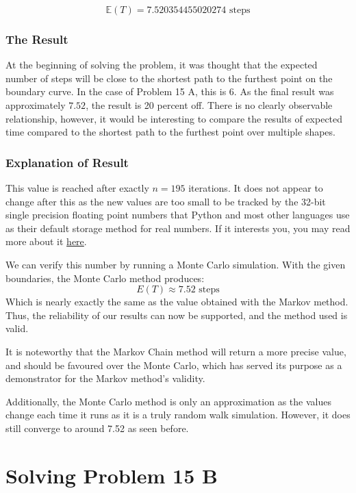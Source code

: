 \documentclass[12pt,a4paper]{article}
\begin{document}
\begin{equation*}
    \mathbb{E}(T) = 7.520354455020274 \text{ steps}
\end{equation*}

\subsubsection{The Result}
At the beginning of solving the problem, it was thought that the expected number of steps will be close to the shortest path to the furthest point on the boundary curve. In the case of Problem 15 A, this is $6$. As the final result was approximately $7.52$, the result is 20 percent off. There is no clearly observable relationship, however, it would be interesting to compare the results of expected time compared to the shortest path to the furthest point over multiple shapes.

\subsubsection{Explanation of Result}
This value is reached after exactly $n = 195$ iterations. It does not appear to change after this as the new values are too small to be tracked by the 32-bit single precision floating point numbers that Python and most other languages use as their default storage method for real numbers. If it interests you, you may read more about it \href{https://en.wikipedia.org/wiki/Single-precision_floating-point_format}{here}.

We can verify this number by running a Monte Carlo simulation. With the given boundaries, the Monte Carlo method produces:
\begin{equation*}
    E(T) \approx 7.52 \text{ steps}
\end{equation*}
Which is nearly exactly the same as the value obtained with the Markov method. Thus, the reliability of our results can now be supported, and the method used is valid.

It is noteworthy that the Markov Chain method will return a more precise value, and should be favoured over the Monte Carlo, which has served its purpose as a demonstrator for the Markov method's validity. 

Additionally, the Monte Carlo method is only an approximation as the values change each time it runs as it is a truly random walk simulation. However, it does still converge to around 7.52 as seen before.


\section{Solving Problem 15 B}
\end{document}
